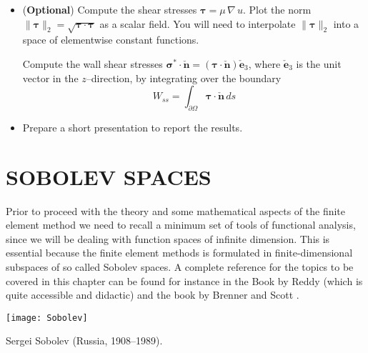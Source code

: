 \begin{kaobox}[frametitle=Implement the following modifications to \texttt{basic\_poisson.py}]
\begin{itemize}
\item (\textbf{Optional}) Compute the shear stresses $\boldsymbol{\tau} = \mu\,\nabla\,u$.
Plot the norm $\|\boldsymbol{\tau}\|_2 = \sqrt{\boldsymbol{\tau}\cdot \boldsymbol{\tau}}$
as a scalar field. 
You will need to interpolate
$\|\boldsymbol{\tau}\|_2$ into a space of elementwise constant functions.
\begin{center}
\begin{minipage}{0.7\textwidth}
    
\end{minipage}
\end{center}
Compute the wall shear stresses
$\boldsymbol{\sigma}^* \cdot \check{\mathbf{n}} =
(\boldsymbol{\tau} \cdot \check{\mathbf{n}}) \check{\mathbf{e}}_3$,
where $\check{\mathbf{e}}_3$ is the unit vector in the $z$--direction,
by integrating over the boundary
\begin{equation}
W_{ss} = \int_{\partial{\Omega}}{\boldsymbol{\tau}\cdot \check{\mathbf{n}}}\,ds \nonumber
\end{equation}
\begin{center}
\begin{minipage}{0.7\textwidth}
    
\end{minipage}
\end{center}

\item Prepare a short presentation to report the results.

\end{itemize}

\end{kaobox}



\setchapterpreamble[u]{\margintoc}
\chapter{SOBOLEV SPACES}

Prior to proceed with the theory and some mathematical
aspects of the finite element method we need to recall
a minimum set of tools of functional analysis, since
we will be dealing with function spaces of infinite
dimension. This is essential because the finite element methods
is formulated in finite-dimensional subspaces of so called
Sobolev spaces. A complete reference for the topics
to be covered in this chapter can be found for instance in the Book by Reddy
\cite{Reddy} (which is quite accessible and didactic) and the book by Brenner
and Scott \cite{Brenner}.
\begin{marginfigure}[1.0cm]
       \texttt{[image: Sobolev]}
       \caption[]{Sergei Sobolev (Russia, 1908--1989).} 
\end{marginfigure}

